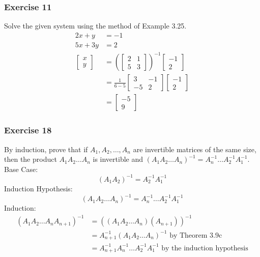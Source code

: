 \documentclass[letterpaper, 12pt]{math}
\begin{document}
\subsubsection*{Exercise 11}
Solve the given system using the method of Example 3.25.
\begin{align*}
  2x+y &= -1 \\
  5x+3y &= 2 \\
  \begin{bmatrix}x \\ y\end{bmatrix} &= \left(\begin{bmatrix}
    2 & 1 \\
    5 & 3
  \end{bmatrix}\right)^{-1}\begin{bmatrix}-1 \\ 2\end{bmatrix} \\
  &= \frac{1}{6-5}\begin{bmatrix}
    3 & -1 \\
    -5 & 2
  \end{bmatrix}\begin{bmatrix}-1 \\ 2\end{bmatrix} \\
  &= \begin{bmatrix}-5 \\ 9\end{bmatrix}
\end{align*}

\subsubsection*{Exercise 18}
By induction, prove that if \( A_1,A_2,\dots,A_n \) are invertible matrices of
the same size, then the product \( A_1A_2\dots A_n \) is invertible and
\( (A_1A_2\dots A_n)^{-1} = A_n^{-1}\dots A_2^{-1}A_1^{-1} \). \\
Base Case:
\[ (A_1A_2)^{-1} = A_2^{-1}A_1^{-1} \]
Induction Hypothesis:
\[ (A_1A_2\dots A_n)^{-1} = A_n^{-1}\dots A_2^{-1}A_1^{-1} \]
Induction:
\begin{align*}
  (A_1A_2\dots A_nA_{n+1})^{-1} &= ((A_1A_2\dots A_n)(A_{n+1}))^{-1} \\
  &= A_{n+1}^{-1}(A_1A_2\dots A_n)^{-1} \text{ by Theorem 3.9c} \\
  &= A_{n+1}^{-1}A_n^{-1}\dots A_2^{-1}A_1^{-1}
    \text{ by the induction hypothesis}
\end{align*}
\end{document}
